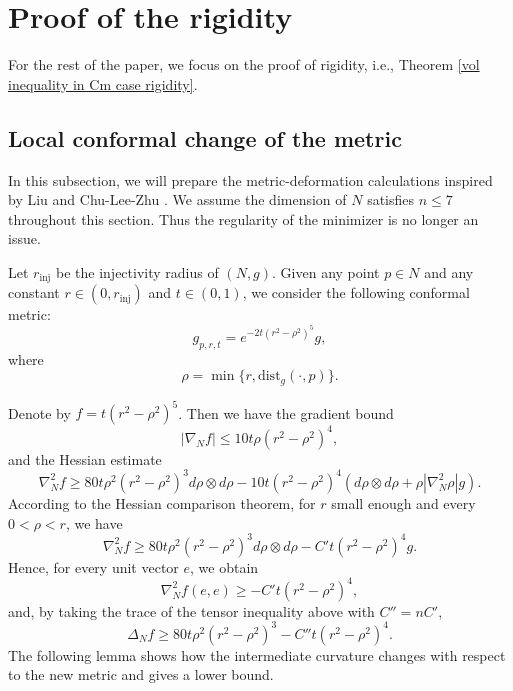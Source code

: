 \documentclass[11pt]{amsart}
\theoremstyle{definition}
\theoremstyle{remark}
\numberwithin{equation}{section}
\begin{document}
    \section{Proof of the rigidity}\label{section4}
    For the rest of the paper, we focus on the proof of rigidity, i.e., Theorem \ref{vol inequality in Cm case rigidity}. 
    \subsection{Local conformal change of the metric}
    In this subsection, we will prepare the metric-deformation calculations inspired by Liu
      \cite{Liu-nonnegative-Ricci-curvature} and Chu-Lee-Zhu \cite{chuleezhu_n_systole}. We assume
      the dimension of $N$ satisfies $n\leq 7$ throughout this section. Thus the regularity of the
      minimizer is no longer an issue.

    Let $r_{\text{inj}}$ be the injectivity radius of $(N,g)$. Given any point $p\in N$ and any
      constant $r\in(0,r_{\text{inj}})$ and $t\in(0,1)$,
      we consider the following conformal metric:
    \[
    g_{p,r,t}=e^{-2t(r^2-\rho^2)^5}g,
    \]
    where
    \[
        \rho=\min\{r,\text{dist}_{g}(\cdot,p)\}.
    \]
    
    Denote by $f=t(r^2-\rho^2)^{5}$. Then we have the gradient bound
        \[
            |\nabla_{N}f|\leq 10t\rho(r^2-\rho^2)^{4},
        \]
        and the Hessian estimate
        \[
        \nabla^{2}_{N}f\geq 80t\rho^2(r^2-\rho^2)^{3}d\rho \otimes d\rho
          -10t(r^2-\rho^2)^{4}(d\rho\otimes d\rho + \rho|\nabla^{2}_{N}\rho|g).
        \]
        According to the Hessian comparison theorem, for $r$ small enough and every $0<\rho<r$, we
          have
        \begin{equation}
            \nabla^{2}_{N}f\geq 80t\rho^2(r^2-\rho^2)^{3}d\rho \otimes d\rho
              -C't(r^2-\rho^2)^4g.
        \end{equation}
        Hence, for every unit vector $e$, we obtain
        \begin{equation}\label{hess_1}
            \nabla_{N}^{2}f(e,e)\geq -C't(r^{2}-\rho^2)^4,
        \end{equation}
        and, by taking the trace of the tensor inequality above with $C''=nC'$,
        \begin{equation}\label{delta}
            \Delta_{N}f\geq 80t\rho^2(r^2-\rho^2)^3-C''t(r^2-\rho^2)^{4}.
        \end{equation}
    The following lemma shows how the intermediate curvature changes with respect to the new metric
      and gives a lower bound.
    
\end{document}
